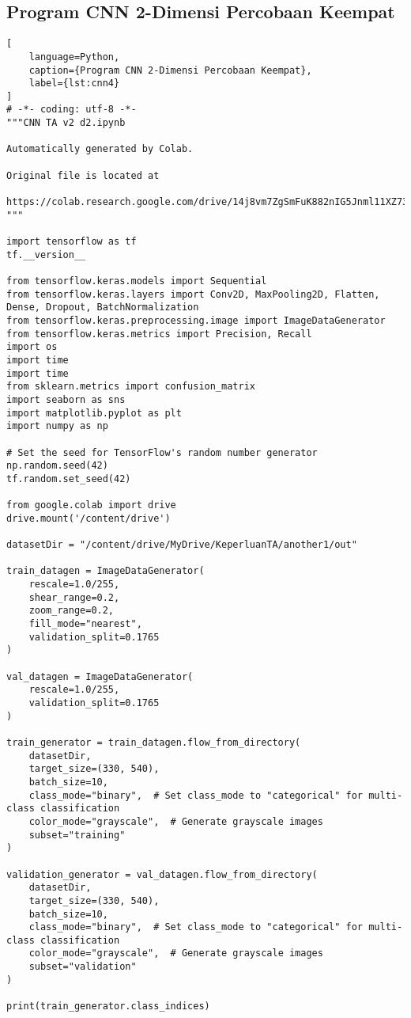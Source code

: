 \subsection*{Program CNN 2-Dimensi Percobaan Keempat}
\begin{lstlisting}[
    language=Python,
    caption={Program CNN 2-Dimensi Percobaan Keempat},
    label={lst:cnn4}
]
# -*- coding: utf-8 -*-
"""CNN TA v2 d2.ipynb

Automatically generated by Colab.

Original file is located at
    https://colab.research.google.com/drive/14j8vm7ZgSmFuK882nIG5Jnml11XZ73hg
"""

import tensorflow as tf
tf.__version__

from tensorflow.keras.models import Sequential
from tensorflow.keras.layers import Conv2D, MaxPooling2D, Flatten, Dense, Dropout, BatchNormalization
from tensorflow.keras.preprocessing.image import ImageDataGenerator
from tensorflow.keras.metrics import Precision, Recall
import os
import time
import time
from sklearn.metrics import confusion_matrix
import seaborn as sns
import matplotlib.pyplot as plt
import numpy as np

# Set the seed for TensorFlow's random number generator
np.random.seed(42)
tf.random.set_seed(42)

from google.colab import drive
drive.mount('/content/drive')

datasetDir = "/content/drive/MyDrive/KeperluanTA/another1/out"

train_datagen = ImageDataGenerator(
    rescale=1.0/255,
    shear_range=0.2,
    zoom_range=0.2,
    fill_mode="nearest",
    validation_split=0.1765
)

val_datagen = ImageDataGenerator(
    rescale=1.0/255,
    validation_split=0.1765
)

train_generator = train_datagen.flow_from_directory(
    datasetDir,
    target_size=(330, 540),
    batch_size=10,
    class_mode="binary",  # Set class_mode to "categorical" for multi-class classification
    color_mode="grayscale",  # Generate grayscale images
    subset="training"
)

validation_generator = val_datagen.flow_from_directory(
    datasetDir,
    target_size=(330, 540),
    batch_size=10,
    class_mode="binary",  # Set class_mode to "categorical" for multi-class classification
    color_mode="grayscale",  # Generate grayscale images
    subset="validation"
)

print(train_generator.class_indices)


\end{lstlisting}
